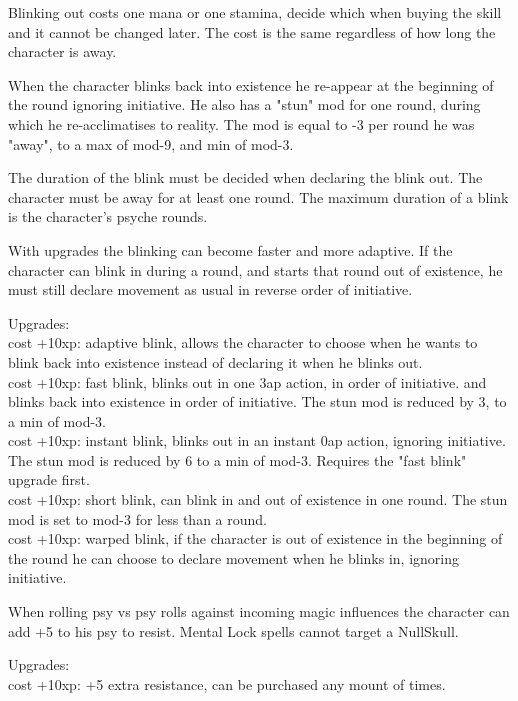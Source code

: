 Blinking out costs one mana or one stamina, decide which when buying the skill and it cannot be changed later. The cost is the same regardless of how long the character is away.

When the character blinks back into existence he re-appear at the beginning of the round ignoring initiative. He also has a "stun" mod for one round, during which he re-acclimatises to reality. The mod is equal to -3 per round he was "away", to a max of mod-9, and min of mod-3.

The duration of the blink must be decided when declaring the blink out.
The character must be away for at least one round. The maximum duration of a blink is the character's psyche rounds.

With upgrades the blinking can become faster and more adaptive. If the character can blink in during a round, and starts that round out of existence, he must still declare movement as usual in reverse order of initiative.

Upgrades: \\
cost +10xp: adaptive blink, allows the character to choose when he wants to blink back into existence instead of declaring it when he blinks out. \\
cost +10xp: fast blink, blinks out in one 3ap action, in order of initiative.
and blinks back into existence in order of initiative. The stun mod is reduced by 3, to a min of mod-3. \\
cost +10xp: instant blink, blinks out in an instant 0ap action, ignoring initiative. The stun mod is reduced by 6 to a min of mod-3. Requires the "fast blink" upgrade first. \\
cost +10xp: short blink, can blink in and out of existence in one round. The stun mod is set to mod-3 for less than a round. \\
cost +10xp: warped blink, if the character is out of existence in the beginning of the round he can choose to declare movement when he blinks in, ignoring initiative.


 When rolling psy vs psy rolls against incoming magic influences the character can add +5 to his psy to resist. Mental Lock spells cannot target a NullSkull.

Upgrades:\\
cost +10xp: +5 extra resistance, can be purchased any mount of times.


